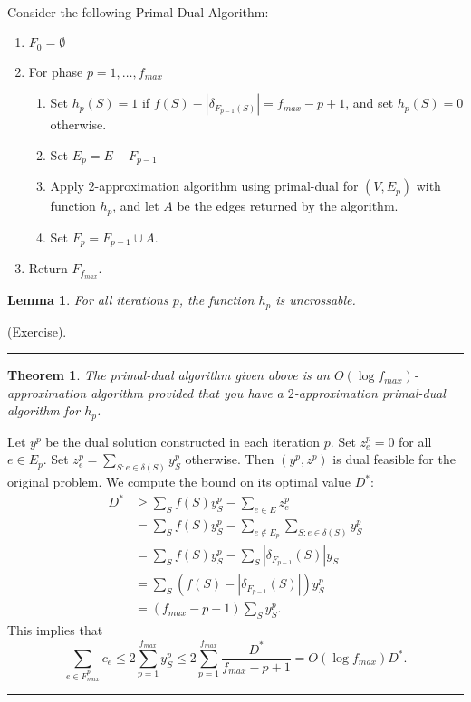 \documentclass[letterpaper,12pt,oneside,onecolumn]{article}
\newenvironment{proof}{{\bf Proof:  }}{\hfill\rule{2mm}{2mm}}
\newtheorem{lemma}[fact]{Lemma}
\newtheorem{theorem}[fact]{Theorem}
\begin{document}
\paragraph{}
Consider the following Primal-Dual Algorithm:
\begin{enumerate}
\item $F_0 = \emptyset$
\item For phase $p = 1, \dots, f_{max}$
	\begin{enumerate}
	\item Set $h_p(S) = 1$ if $f(S) - |\delta_{F_{p-1}(S)}| = f_{max} - p + 1$, and set $h_p(S) = 0$ otherwise.
	\item Set $E_p = E - F_{p-1}$
	\item Apply $2$-approximation algorithm using primal-dual for $(V,E_p)$ with function $h_p$, and let $A$ be the edges returned by the algorithm.
	\item Set $F_p = F_{p-1} \cup A$.
	\end{enumerate}
\item Return $F_{f_{max}}$.
\end{enumerate}
\begin{lemma}
For all iterations $p$, the function $h_p$ is uncrossable.
\end{lemma}
\begin{proof}
(Exercise).
\end{proof}
\begin{theorem}
The primal-dual algorithm given above is an $O(\log f_{max})$-approximation algorithm provided that you have a $2$-approximation primal-dual algorithm for $h_p$.
\end{theorem}
\begin{proof}
Let $y^p$ be the dual solution constructed in each iteration $p$. Set $z_e^p = 0$ for all $e \in E_p$. Set $z_e^p = \sum_{S: e\in \delta(S)} y_S^p$ otherwise. Then $(y^p, z^p)$ is dual feasible for the original problem. We compute the bound on its optimal value $D^*$:
\begin{align*}
D^* &\geq \sum_S f(S) y_S^p - \sum_{e\in E} z_e^p\\
& = \sum_S f(S) y_S^p - \sum_{e\not\in E_p}\sum_{S : e\in\delta(S)}y_S^p\\
&= \sum_S f(S) y_S^p - \sum_S |\delta_{F_{p-1}}(S)| y_S \\
&= \sum_S (f(S) - |\delta_{F_{p-1}}(S)|)y_S^p \\
&= (f_{max} - p + 1)\sum_S y_S^p.
\end{align*}
This implies that
$$\sum_{e \in F_{max}^p} c_e \leq 2 \sum_{p=1}^{f_{max}} y_S^p \leq 2 \sum_{p=1}^{f_{max}} \frac{D^*}{f_{max} - p + 1} = O(\log f_{max}) D^* .$$
\end{proof}
\end{document}
